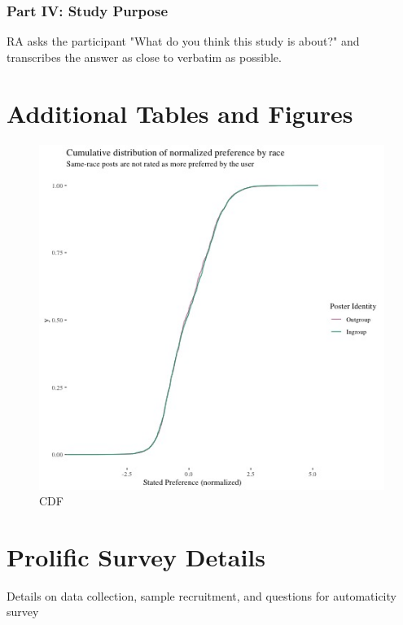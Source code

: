 \documentclass[12pt,letterpaper]{article}
\begin{document}
\subsubsection{Part IV: Study Purpose} RA asks the participant "What do you think this study is about?" and transcribes the answer as close to verbatim as possible.

\section{Additional Tables and Figures}\label{app:tab_fig}

\begin{figure}[!h]
    \centering
    \includegraphics[scale=.8]{Output/Graphs/Audit/Stated preferences/US NF cdf norm preferences by ingroup.jpg}
    \caption{CDF}
    \label{fig:prefcdf}
\end{figure}

\section{Prolific Survey Details}\label{app:survey}

Details on data collection, sample recruitment, and questions for automaticity survey
\end{document}

